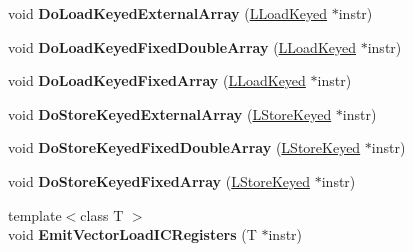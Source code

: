 \begin{DoxyCompactItemize}
\item 
void {\bfseries Do\+Load\+Keyed\+External\+Array} (\hyperlink{classv8_1_1internal_1_1_l_load_keyed}{L\+Load\+Keyed} $\ast$instr)\hypertarget{classv8_1_1internal_1_1_l_code_gen_aba1cb2ce022b8f9b1e4a86a9f57356c8}{}\label{classv8_1_1internal_1_1_l_code_gen_aba1cb2ce022b8f9b1e4a86a9f57356c8}

\item 
void {\bfseries Do\+Load\+Keyed\+Fixed\+Double\+Array} (\hyperlink{classv8_1_1internal_1_1_l_load_keyed}{L\+Load\+Keyed} $\ast$instr)\hypertarget{classv8_1_1internal_1_1_l_code_gen_aa7b2c7080c1f9724950a1a7c83e0a0ba}{}\label{classv8_1_1internal_1_1_l_code_gen_aa7b2c7080c1f9724950a1a7c83e0a0ba}

\item 
void {\bfseries Do\+Load\+Keyed\+Fixed\+Array} (\hyperlink{classv8_1_1internal_1_1_l_load_keyed}{L\+Load\+Keyed} $\ast$instr)\hypertarget{classv8_1_1internal_1_1_l_code_gen_aec64c3b23ea28f8a563d436fa0bc39f3}{}\label{classv8_1_1internal_1_1_l_code_gen_aec64c3b23ea28f8a563d436fa0bc39f3}

\item 
void {\bfseries Do\+Store\+Keyed\+External\+Array} (\hyperlink{classv8_1_1internal_1_1_l_store_keyed}{L\+Store\+Keyed} $\ast$instr)\hypertarget{classv8_1_1internal_1_1_l_code_gen_ac194b20beddd01650a1534290eb6c41f}{}\label{classv8_1_1internal_1_1_l_code_gen_ac194b20beddd01650a1534290eb6c41f}

\item 
void {\bfseries Do\+Store\+Keyed\+Fixed\+Double\+Array} (\hyperlink{classv8_1_1internal_1_1_l_store_keyed}{L\+Store\+Keyed} $\ast$instr)\hypertarget{classv8_1_1internal_1_1_l_code_gen_af87a3bb48b2b2ce3880ca8aacf62b397}{}\label{classv8_1_1internal_1_1_l_code_gen_af87a3bb48b2b2ce3880ca8aacf62b397}

\item 
void {\bfseries Do\+Store\+Keyed\+Fixed\+Array} (\hyperlink{classv8_1_1internal_1_1_l_store_keyed}{L\+Store\+Keyed} $\ast$instr)\hypertarget{classv8_1_1internal_1_1_l_code_gen_a126ac600bb5f30c98bef6e57a096d9a9}{}\label{classv8_1_1internal_1_1_l_code_gen_a126ac600bb5f30c98bef6e57a096d9a9}

\item 
{\footnotesize template$<$class T $>$ }\\void {\bfseries Emit\+Vector\+Load\+I\+C\+Registers} (T $\ast$instr)\hypertarget{classv8_1_1internal_1_1_l_code_gen_a31e396d22475d9c9dec1ac0e5030380a}{}\label{classv8_1_1internal_1_1_l_code_gen_a31e396d22475d9c9dec1ac0e5030380a}


\end{DoxyCompactItemize}
